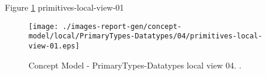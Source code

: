 Figure \ref{fig:lu.uni.lassy.excalibur.standard.specification.libraries-CM-view-local-PrimaryTypes-Datatypes-04} primitives-local-view-01



\begin{figure}[htbp] 
\label{fig:lu.uni.lassy.excalibur.standard.specification.libraries-CM}
\begin{center}
\texttt{[image: ./images-report-gen/concept-model/local/PrimaryTypes-Datatypes/04/primitives-local-view-01.eps]}
\end{center}
\caption[Concept Model - PrimaryTypes-Datatypes local view 04 - ]{Concept Model - PrimaryTypes-Datatypes local view 04. .}
\label{fig:lu.uni.lassy.excalibur.standard.specification.libraries-CM-view-local-PrimaryTypes-Datatypes-04}
\end{figure}
\vspace{0.5cm} 
